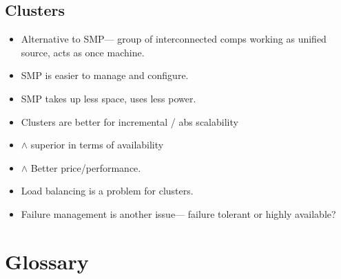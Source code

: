 \documentclass[fontsize=4.5pt]{scrartcl}
\begin{document}
\begin{multicols}{3}
      \subsection{Clusters}
        \begin{itemize}
          \item Alternative to SMP--- group of interconnected comps working as unified source, acts as once machine.
          \item SMP is easier to manage and configure.
          \item SMP takes up less space, uses less power.
          \item Clusters are better for incremental / abs scalability
          \item $\wedge$ superior in terms of availability
          \item $\wedge$ Better price/performance.
          \item Load balancing is a problem for clusters.
          \item Failure management is another issue--- failure tolerant or highly available?
        \end{itemize}


  \section{Glossary}

\end{multicols}
\end{document}
